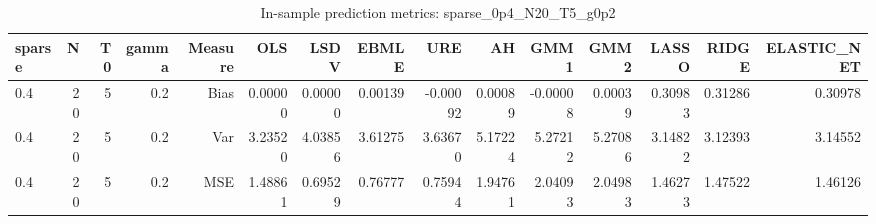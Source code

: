 \begin{table}[!htbp]\centering
\caption{In-sample prediction metrics: sparse_0p4_N20_T5_g0p2}
\label{tab:table2_sparse_0p4_N20_T5_g0p2}
\begin{tabular}{lrrrrrrrrrrrrrr}
\hline
sparse & N & T0 & gamma & Measure & OLS & LSDV & EBMLE & URE & AH & GMM1 & GMM2 & LASSO & RIDGE & ELASTIC_NET \\
\hline
0.4 & 20 & 5 & 0.2 & Bias & 0.00000 & 0.00000 & 0.00139 & -0.00092 & 0.00089 & -0.00008 & 0.00039 & 0.30983 & 0.31286 & 0.30978 \\
0.4 & 20 & 5 & 0.2 & Var & 3.23520 & 4.03856 & 3.61275 & 3.63670 & 5.17224 & 5.27212 & 5.27086 & 3.14822 & 3.12393 & 3.14552 \\
0.4 & 20 & 5 & 0.2 & MSE & 1.48861 & 0.69529 & 0.76777 & 0.75944 & 1.94761 & 2.04093 & 2.04983 & 1.46273 & 1.47522 & 1.46126 \\
\hline
\end{tabular}
\end{table}

